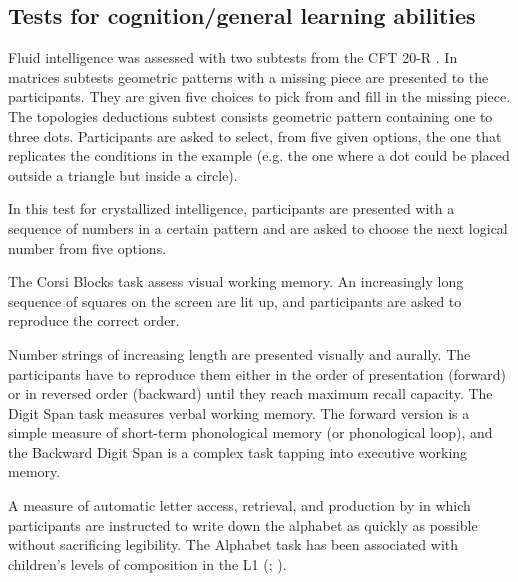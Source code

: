\documentclass[output=paper]{langsci/langscibook}
\begin{document}
\subsection{Tests for cognition/general learning abilities}
\begin{description}\sloppy
\item[CFT 20-R: Matrices and topological deductions \citep{Weiss2006}] Fluid intelligence was assessed with two subtests from the CFT 20-R \citep{Weiss2006}. In matrices subtests geometric patterns with a missing piece are presented to the participants. They are given five choices to pick from and fill in the missing piece. The topologies deductions subtest consists geometric pattern containing one to three dots. Participants are asked to select, from five given options, the one that replicates the conditions in the example (e.g. the one where a dot could be placed outside a triangle but inside a circle).

\item[CFT-20-R: Number sequences \citep{Weiss2006}] In this test for crystallized intelligence, participants are presented with a sequence of numbers in a certain pattern and are asked to choose the next logical number from five options.

\item[Corsi Blocks] The Corsi Blocks task assess visual working memory. An increasingly long sequence of squares on the screen are lit up, and participants are asked to reproduce the correct order.

\item[Digit Span (Forward/Backward)] Number strings of increasing length are presented visually and aurally. The participants have to reproduce them either in the order of presentation (forward) or in reversed order (backward) until they reach maximum recall capacity. The Digit Span task measures verbal working memory. The forward version is a simple measure of short-term phonological memory (or phonological loop), and the Backward Digit Span is a complex task tapping into executive working memory.

\item[Alphabet Task] A measure of automatic letter access, retrieval, and production by \citet{BerningerEtAl1992} in which participants are instructed to write down the alphabet as quickly as possible without sacrificing legibility. The Alphabet task has been associated with children’s levels of composition in the L1 (\citealt{BerningerEtAl1997}; \citealt{GrahamEtAl2006}).


\end{description}
\end{document}
